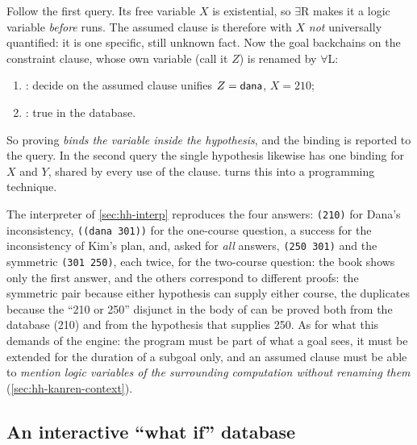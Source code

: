 {\begin{tutorial}
Follow the first query. Its free variable $X$ is existential, so $\exists$R makes it a logic variable
\emph{before}  runs. The assumed clause is therefore  with
$X$ \emph{not} universally quantified: it is one specific, still unknown fact. Now the goal 
backchains on the constraint clause, whose own variable (call it $Z$) is renamed by $\forall$L:
\begin{enumerate}
  \item {}: decide on the assumed clause unifies $Z=\mathsf{dana}$, $X=210$;
  \item {}: true in the database.
\end{enumerate}
So proving  \emph{binds the variable inside the hypothesis}, and the binding is reported to
the query. In the second query the single hypothesis  likewise has one binding
for $X$ and $Y$, shared by every use of the clause.  turns this into a
programming technique.
\end{tutorial}

\begin{kanren}
The interpreter of \cref{sec:hh-interp} reproduces the four answers: \texttt{(210)} for Dana's
inconsistency, \texttt{((dana 301))} for the one-course question, a success for the inconsistency of Kim's
plan, and, asked for \emph{all} answers, \texttt{(250 301)} and the symmetric \texttt{(301 250)}, each
twice, for the two-course question: the book shows only the first answer, and the others correspond to
different proofs: the symmetric pair because either hypothesis can supply either course, the duplicates
because the ``210 or 250'' disjunct in the body of  can be proved both from the database
(210) and from the hypothesis that supplies 250. As for what this demands of
the engine: the program must be part of what a goal sees, it must be extended for the duration of a
subgoal only, and an assumed clause must be able to \emph{mention logic variables of the surrounding
computation without renaming them} (\cref{sec:hh-kanren-context}).
\end{kanren}

\subsection{An interactive ``what if'' database}

}
